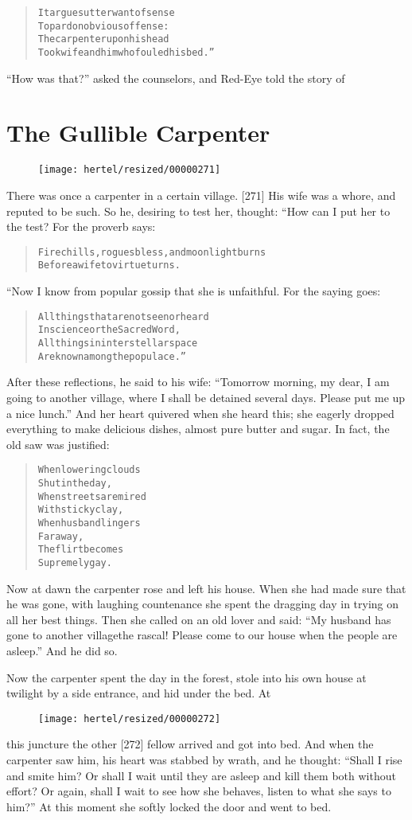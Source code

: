 \documentclass[article, twoside, 10pt]{memoir}
\renewenvironment{verbatim}{%
\begin{quote}%
\vskip -10pt%
\begin{alltt}\normalfont\small}{\end{alltt}%
\end{quote}%
\vskip -10pt
} %
\begin{document}
\begin{verbatim}
It argues utter want of sense
To pardon obvious offense:
The carpenter upon his head
Took wife and him who fouled his bed.”
\end{verbatim}
``How was that?'' asked the counselors, and Red-Eye told the story
of

\chapter{The Gullible Carpenter}

\begin{figure}[p]\texttt{[image: hertel/resized/00000271]}\end{figure}There was once a carpenter in a certain village. [271] His wife was
a whore, and reputed to be such. So he, desiring to test her,
thought: “How can I put her to the test? For the proverb says:

\begin{verbatim}
Fire chills, rogues bless, and moonlight burns
Before a wife to virtue turns.
\end{verbatim}
“Now I know from popular gossip that she is unfaithful. For the
saying goes:

\begin{verbatim}
All things that are not seen or heard
In science or the Sacred Word,
All things in interstellar space
Are known among the populace.”
\end{verbatim}
After these reflections, he said to his wife:
``Tomorrow morning, my dear, I am going to another village, where I shall be detained several days. Please put me up a nice lunch.''
And her heart quivered when she heard this; she eagerly dropped
everything to make delicious dishes, almost pure butter and sugar.
In fact, the old saw was justified:

\begin{verbatim}
When lowering clouds
    Shut in the day,
When streets are mired
    With sticky clay,
When husband lingers
    Far away,
The flirt becomes
    Supremely gay.
\end{verbatim}
Now at dawn the carpenter rose and left his house. When she had
made sure that he was gone, with laughing countenance she spent the
dragging day in trying on all her best things. Then she called on
an old lover and said:
``My husband has gone to another village{\textemdash}the rascal! Please come to our house when the people are asleep.''
And he did so.

Now the carpenter spent the day in the forest, stole into his own
house at twilight by a side entrance, and hid under the bed. At
\begin{figure}[p]\texttt{[image: hertel/resized/00000272]}\end{figure}this juncture the other [272] fellow arrived and got into bed. And
when the carpenter saw him, his heart was stabbed by wrath, and he
thought:
``Shall I rise and smite him? Or shall I wait until they are asleep and kill them both without effort? Or again, shall I wait to see how she behaves, listen to what she says to him?''
At this moment she softly locked the door and went to bed.
\end{document}
